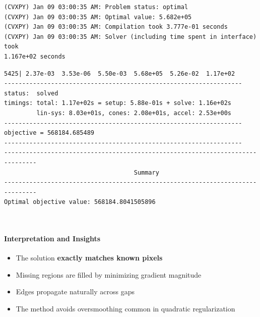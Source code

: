\documentclass[11pt]{article}
\providecommand{\tightlist}{%
      \setlength{\itemsep}{0pt}\setlength{\parskip}{0pt}}
\begin{document}
    \begin{Verbatim}[commandchars=\\\{\}]
(CVXPY) Jan 09 03:00:35 AM: Problem status: optimal
(CVXPY) Jan 09 03:00:35 AM: Optimal value: 5.682e+05
(CVXPY) Jan 09 03:00:35 AM: Compilation took 3.777e-01 seconds
(CVXPY) Jan 09 03:00:35 AM: Solver (including time spent in interface) took
1.167e+02 seconds
    \end{Verbatim}

    \begin{Verbatim}[commandchars=\\\{\}]
  5425| 2.37e-03  3.53e-06  5.50e-03  5.68e+05  5.26e-02  1.17e+02
------------------------------------------------------------------
status:  solved
timings: total: 1.17e+02s = setup: 5.88e-01s + solve: 1.16e+02s
         lin-sys: 8.03e+01s, cones: 2.08e+01s, accel: 2.53e+00s
------------------------------------------------------------------
objective = 568184.685489
------------------------------------------------------------------
-------------------------------------------------------------------------------
                                    Summary
-------------------------------------------------------------------------------
Optimal objective value: 568184.8041505896
    \end{Verbatim}

    \begin{center}
    \end{center}
    { \hspace*{\fill} \\}
    
    \hypertarget{interpretation-and-insights}{%
\paragraph{\texorpdfstring{\textbf{Interpretation and
Insights}}{Interpretation and Insights}}\label{interpretation-and-insights}}

\begin{itemize}
\tightlist
\item
  The solution \textbf{exactly matches known pixels}
\item
  Missing regions are filled by minimizing gradient magnitude
\item
  Edges propagate naturally across gaps
\item
  The method avoids oversmoothing common in quadratic regularization
\end{itemize}
\end{document}
